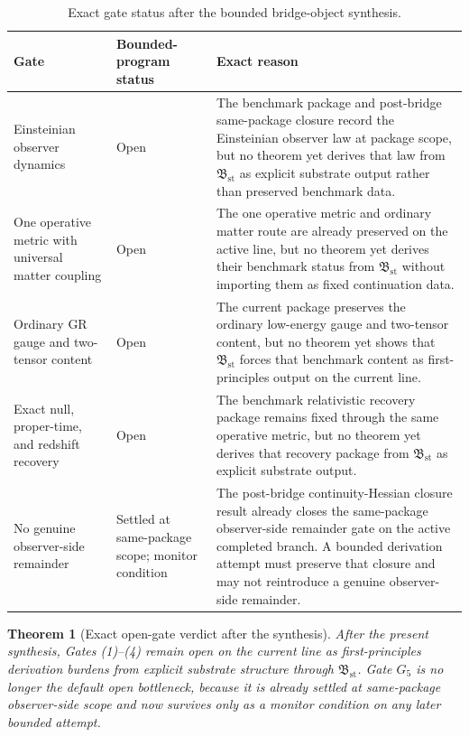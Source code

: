 \documentclass[11pt]{article}
\newcommand{\StableBridgeObject}{\mathfrak B_{\mathrm{st}}}
\newcommand{\GateFive}{G_{5}}
\newtheorem{theorem}{Theorem}
\begin{document}
\begin{table}[ht]
\centering
\renewcommand{\arraystretch}{1.2}
\begin{tabular}{>{\raggedright\arraybackslash}p{} >{\raggedright\arraybackslash}p{} >{\raggedright\arraybackslash}p{}}
\toprule
\textbf{Gate} & \textbf{Bounded-program status} & \textbf{Exact reason} \\
\midrule
Einsteinian observer dynamics & Open & The benchmark package and post-bridge same-package closure record the Einsteinian observer law at package scope, but no theorem yet derives that law from \(\StableBridgeObject\) as explicit substrate output rather than preserved benchmark data. \\
One operative metric with universal matter coupling & Open & The one operative metric and ordinary matter route are already preserved on the active line, but no theorem yet derives their benchmark status from \(\StableBridgeObject\) without importing them as fixed continuation data. \\
Ordinary GR gauge and two-tensor content & Open & The current package preserves the ordinary low-energy gauge and two-tensor content, but no theorem yet shows that \(\StableBridgeObject\) forces that benchmark content as first-principles output on the current line. \\
Exact null, proper-time, and redshift recovery & Open & The benchmark relativistic recovery package remains fixed through the same operative metric, but no theorem yet derives that recovery package from \(\StableBridgeObject\) as explicit substrate output. \\
No genuine observer-side remainder & Settled at same-package scope; monitor condition & The post-bridge continuity-Hessian closure result already closes the same-package observer-side remainder gate on the active completed branch. A bounded derivation attempt must preserve that closure and may not reintroduce a genuine observer-side remainder. \\
\bottomrule
\end{tabular}
\caption{Exact gate status after the bounded bridge-object synthesis.}
\label{tab:gates}
\end{table}

\begin{theorem}[Exact open-gate verdict after the synthesis]
After the present synthesis, Gates (1)--(4) remain open on the current line as first-principles derivation burdens from explicit substrate structure through \(\StableBridgeObject\). Gate \(\GateFive\) is no longer the default open bottleneck, because it is already settled at same-package observer-side scope and now survives only as a monitor condition on any later bounded attempt.
\end{theorem}
\end{document}
